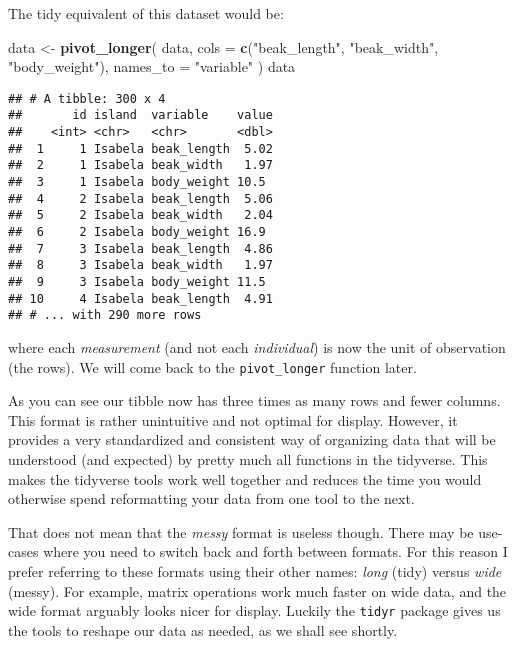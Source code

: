 \documentclass[
]{book}
\newenvironment{Shaded}{}{}
\newcommand{\DataTypeTok}[1]{\textcolor[rgb]{0.56,0.13,0.00}{#1}}
\newcommand{\KeywordTok}[1]{\textcolor[rgb]{0.00,0.44,0.13}{\textbf{#1}}}
\newcommand{\NormalTok}[1]{#1}
\newcommand{\StringTok}[1]{\textcolor[rgb]{0.25,0.44,0.63}{#1}}
\begin{document}
The tidy equivalent of this dataset would be:

\begin{Shaded}
\begin{Highlighting}[]
\NormalTok{data <-}\StringTok{ }\KeywordTok{pivot_longer}\NormalTok{(}
\NormalTok{  data, }
  \DataTypeTok{cols =} \KeywordTok{c}\NormalTok{(}\StringTok{"beak_length"}\NormalTok{, }\StringTok{"beak_width"}\NormalTok{, }\StringTok{"body_weight"}\NormalTok{),}
  \DataTypeTok{names_to =} \StringTok{"variable"}
\NormalTok{)}
\NormalTok{data}
\end{Highlighting}
\end{Shaded}

\begin{verbatim}
## # A tibble: 300 x 4
##       id island  variable    value
##    <int> <chr>   <chr>       <dbl>
##  1     1 Isabela beak_length  5.02
##  2     1 Isabela beak_width   1.97
##  3     1 Isabela body_weight 10.5 
##  4     2 Isabela beak_length  5.06
##  5     2 Isabela beak_width   2.04
##  6     2 Isabela body_weight 16.9 
##  7     3 Isabela beak_length  4.86
##  8     3 Isabela beak_width   1.97
##  9     3 Isabela body_weight 11.5 
## 10     4 Isabela beak_length  4.91
## # ... with 290 more rows
\end{verbatim}

where each \emph{measurement} (and not each \emph{individual}) is now the unit of observation (the rows). We will come back to the \texttt{pivot\_longer} function later.

As you can see our tibble now has three times as many rows and fewer columns. This format is rather unintuitive and not optimal for display. However, it provides a very standardized and consistent way of organizing data that will be understood (and expected) by pretty much all functions in the tidyverse. This makes the tidyverse tools work well together and reduces the time you would otherwise spend reformatting your data from one tool to the next.

That does not mean that the \emph{messy} format is useless though. There may be use-cases where you need to switch back and forth between formats. For this reason I prefer referring to these formats using their other names: \emph{long} (tidy) versus \emph{wide} (messy). For example, matrix operations work much faster on wide data, and the wide format arguably looks nicer for display. Luckily the \texttt{tidyr} package gives us the tools to reshape our data as needed, as we shall see shortly.
\end{document}
